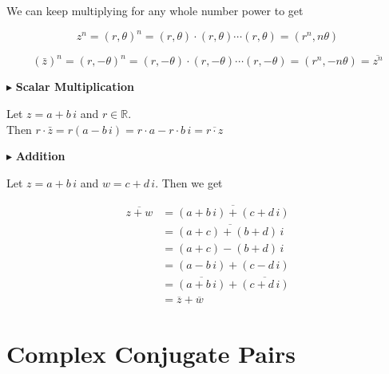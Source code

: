 \documentclass{ximera}
\begin{document}
We can keep multiplying for any whole number power to get 


\[   z^n = (r, \theta)^n =  (r, \theta) \cdot (r, \theta) \cdots (r, \theta)= (r^n, n\theta)                \]




\[   (\bar{z})^n = (r, -\theta)^n =  (r, -\theta) \cdot (r, -\theta) \cdots (r, -\theta)= (r^n, -n\theta)  = \overline{z^n}              \]









$\blacktriangleright$ \textbf{Scalar Multiplication}


Let $z = a + b \, i$  and $r \in \mathbb{R}$. \\

Then $r \cdot \bar{z} = r(a - b \, i) = r \cdot a - r \cdot b \, i = \overline{r \cdot z}$







$\blacktriangleright$ \textbf{Addition}


Let $z = a + b \, i$ and $w = c + d \, i$.  Then we get


\begin{align*}
\overline{z + w} & = \overline{(a + b \, i) + (c + d \, i)}  \\
                & = \overline{(a + c) + (b + d) \, i}   \\
                & = (a + c) - (b + d) \, i  \\
                & = (a - b \, i) + (c - d \, i)   \\
                & = \overline{(a + b \, i)} + \overline{(c + d \, i)}  \\
                & = \overline{z} + \overline{w}
\end{align*}























\section{Complex Conjugate Pairs}
\end{document}
